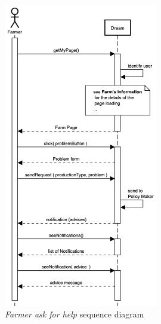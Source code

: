 \begin{enumerate}
    \begin{figure}[H]
        \begin{center}
        \includegraphics[width=0.6\textwidth]{sequence/HelpRequest.png}
        \caption{\emph{Farmer ask for help} sequence diagram}
        \label{fig:sequence7}
        \end{center}
    \end{figure}


\end{enumerate}
